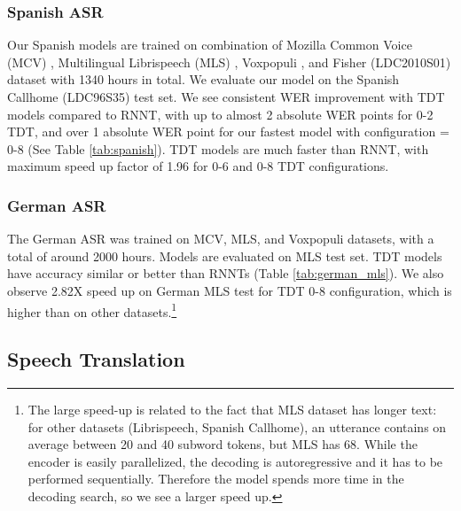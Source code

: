 \documentclass{article}
\begin{document}
\subsubsection{Spanish ASR}
Our Spanish models are trained on combination of Mozilla Common Voice (MCV) \cite{ardila2019common}, Multilingual Librispeech (MLS) \cite{pratap2020mls}, Voxpopuli \cite{wang2021voxpopuli}, and Fisher {(LDC2010S01)} 
dataset with 1340 hours in total. We evaluate our model on the Spanish Callhome (LDC96S35) test set. We see consistent WER improvement with TDT models compared to RNNT, with up to almost 2 absolute WER points for 0-2 TDT, and over 1 absolute WER point for our fastest model with configuration = 0-8 (See  Table \ref{tab:spanish}). 
TDT models are much faster than RNNT, with maximum speed up factor of 1.96 for  0-6 and 0-8 TDT configurations.

\subsubsection{German ASR}
 The German ASR was trained on MCV, MLS, and Voxpopuli datasets, with a total of around 2000 hours. Models are evaluated on
MLS test set. 
TDT models have accuracy similar or better than RNNTs (Table \ref{tab:german_mls}). We also observe 2.82X speed up on German MLS test for TDT 0-8 configuration, which is higher than on other datasets.\footnote{The large speed-up is related to the fact that MLS dataset has longer text: for other datasets (Librispeech, Spanish Callhome), an utterance contains on average between 20 and 40 subword tokens, but MLS has 68. While the encoder  is easily parallelized, the decoding is autoregressive and it has to be performed sequentially. Therefore the model spends more time in the decoding search, so we see a larger speed up.}










\subsection{Speech Translation}
\end{document}
